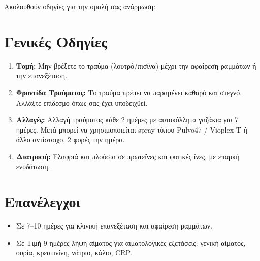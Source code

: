 \documentclass[10pt,greek]{article}
\begin{document}
\begin{PatientInfo}
\end{PatientInfo}


Ακολουθούν οδηγίες για την ομαλή σας ανάρρωση:

\section*{Γενικές Οδηγίες}
\begin{enumerate}[label=\arabic*.]
\setlength{\parskip}{6pt}
\item \textbf{Τομή:} Μην βρέξετε το τραύμα (λουτρό/πισίνα) μέχρι την αφαίρεση ραμμάτων ή την επανεξέταση.
\item \textbf{Φροντίδα Τραύματος:} Το τραύμα πρέπει να παραμένει καθαρό και στεγνό. Αλλάξτε επίδεσμο όπως σας έχει υποδειχθεί.
\item \textbf{Αλλαγές:} Αλλαγή τραύματος κάθε 2 ημέρες με αυτοκόλλητα γαζάκια για 7 ημέρες. Μετά μπορεί να χρησιμοποιείται spray τύπου Pulvo47 / Vioplex-T ή άλλο αντίστοιχο, 2 φορές την ημέρα.
\item \textbf{Διατροφή:} Ελαφριά και πλούσια σε πρωτεΐνες και φυτικές ίνες, με επαρκή ενυδάτωση.
\end{enumerate}

\section*{Επανέλεγχοι}
\begin{itemize}
\item Σε 7--10 ημέρες για κλινική επανεξέταση και αφαίρεση ραμμάτων.
\item Σε Τιμή 9 ημέρες λήψη αίματος για αιματολογικές εξετάσεις: γενική αίματος, ουρία, κρεατινίνη, νάτριο, κάλιο, CRP.
\end{itemize}

\end{document}

